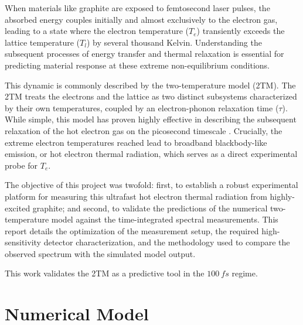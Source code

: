 \documentclass[
	a4paper,
]{scrarticle}
\begin{document}
When materials like graphite are exposed to femtosecond laser pulses, the absorbed energy couples initially and almost exclusively to the electron gas, leading to a state where the electron temperature ($T_e$) transiently exceeds the lattice temperature ($T_l$) by several thousand Kelvin. Understanding the subsequent processes of energy transfer and thermal relaxation is essential for predicting material response at these extreme non-equilibrium conditions.

This dynamic is commonly described by the two-temperature model (2TM). The 2TM treats the electrons and the lattice as two distinct subsystems characterized by their own temperatures, coupled by an electron-phonon relaxation time ($\tau$). While simple, this model has proven highly effective in describing the subsequent relaxation of the hot electron gas on the picosecond timescale \cite{stangeHotElectronCooling2015}. Crucially, the extreme electron temperatures reached lead to broadband blackbody-like emission, or hot electron thermal radiation, which serves as a direct experimental probe for $T_e$.

The objective of this project was twofold: first, to establish a robust experimental platform for measuring this ultrafast hot electron thermal radiation from highly-excited graphite; and second, to validate the predictions of the numerical two-temperature model against the time-integrated spectral measurements. This report details the optimization of the measurement setup, the required high-sensitivity detector characterization, and the methodology used to compare the observed spectrum with the simulated model output.

This work validates the 2TM as a predictive tool in the $\SI{100}{fs}$ regime.

\clearpage
\section{Numerical Model}
\end{document}
